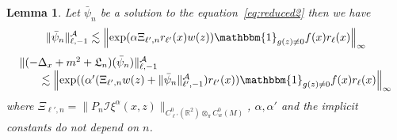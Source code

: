 \documentclass[a4paper,10pt]{article}
\newcommand{\nobracket}{}
\newtheorem{lemma}{Lemma}
\begin{document}
\begin{lemma}
  \label{lemma_reduced1}Let $\bar{\psi}_n$ be a solution to the
  equation~{\eqref{eq:reduced2}} then we have
  \begin{equation}
    \| \bar{\psi}_n \|^{\mathcal{A}}_{\ell, - 1} \lesssim \left\| \exp (\alpha
    \Xi_{\ell', n} r_{\ell'} (x) w (z)) \mathbbm{1}_{g (z) \not{=} 0} f (x)
    r_{\ell} (x) \right\|_{\infty} \label{eq:inequality1}
  \end{equation}
  \begin{equation}
    \begin{array}{l}
      \| (- \Delta_x + m^2 + \mathfrak{L}_n) (\bar{\psi}_n)
      \|^{\mathcal{A}}_{\ell, - 1}\\
      \qquad \lesssim \left\| \exp ((\alpha' (\Xi_{\ell', n} w (z) + \|
      \bar{\psi}_n \|^{\mathcal{A}}_{\ell', - 1}) r_{\ell'} (x \nobracket))
      \mathbbm{1}_{g (z) \not{=} 0} f (x) r_{\ell} (x) \right\|_{\infty}
    \end{array} \label{eq:inequality2}
  \end{equation}
  where $\Xi_{\ell', n} = \| P_n \mathcal{I} \xi^{\alpha} (x, z)
  \|_{\nobracket C^0_{\ell'} (\mathbb{R}^2 \nobracket) \otimes_{\pi} C^0_w
  (M)}$, $\alpha, \alpha'$ and the implicit constants do not depend on $n$.
\end{lemma}
\end{document}
